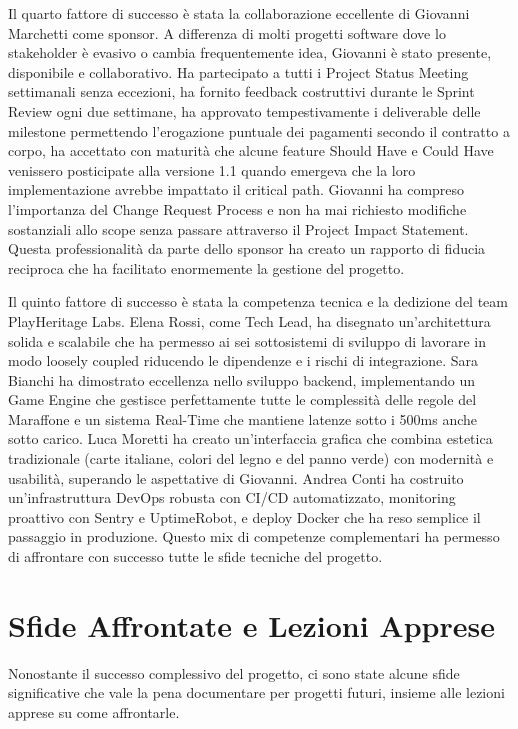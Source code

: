 Il quarto fattore di successo è stata la collaborazione eccellente di Giovanni Marchetti come sponsor. A differenza di molti progetti software dove lo stakeholder è evasivo o cambia frequentemente idea, Giovanni è stato presente, disponibile e collaborativo. Ha partecipato a tutti i Project Status Meeting settimanali senza eccezioni, ha fornito feedback costruttivi durante le Sprint Review ogni due settimane, ha approvato tempestivamente i deliverable delle milestone permettendo l'erogazione puntuale dei pagamenti secondo il contratto a corpo, ha accettato con maturità che alcune feature Should Have e Could Have venissero posticipate alla versione 1.1 quando emergeva che la loro implementazione avrebbe impattato il critical path. Giovanni ha compreso l'importanza del Change Request Process e non ha mai richiesto modifiche sostanziali allo scope senza passare attraverso il Project Impact Statement. Questa professionalità da parte dello sponsor ha creato un rapporto di fiducia reciproca che ha facilitato enormemente la gestione del progetto.

Il quinto fattore di successo è stata la competenza tecnica e la dedizione del team PlayHeritage Labs. Elena Rossi, come Tech Lead, ha disegnato un'architettura solida e scalabile che ha permesso ai sei sottosistemi di sviluppo di lavorare in modo loosely coupled riducendo le dipendenze e i rischi di integrazione. Sara Bianchi ha dimostrato eccellenza nello sviluppo backend, implementando un Game Engine che gestisce perfettamente tutte le complessità delle regole del Maraffone e un sistema Real-Time che mantiene latenze sotto i 500ms anche sotto carico. Luca Moretti ha creato un'interfaccia grafica che combina estetica tradizionale (carte italiane, colori del legno e del panno verde) con modernità e usabilità, superando le aspettative di Giovanni. Andrea Conti ha costruito un'infrastruttura DevOps robusta con CI/CD automatizzato, monitoring proattivo con Sentry e UptimeRobot, e deploy Docker che ha reso semplice il passaggio in produzione. Questo mix di competenze complementari ha permesso di affrontare con successo tutte le sfide tecniche del progetto.

\section{Sfide Affrontate e Lezioni Apprese}

Nonostante il successo complessivo del progetto, ci sono state alcune sfide significative che vale la pena documentare per progetti futuri, insieme alle lezioni apprese su come affrontarle.


